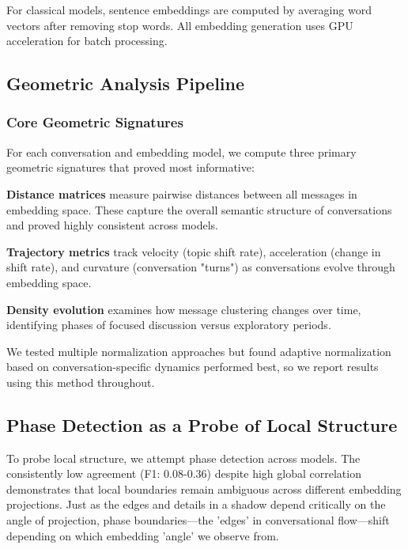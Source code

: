 \documentclass[11pt,letterpaper]{article}
\begin{document}
For classical models, sentence embeddings are computed by averaging word vectors after removing stop words. All embedding generation uses GPU acceleration for batch processing.

\subsection{Geometric Analysis Pipeline}

\subsubsection{Core Geometric Signatures}

For each conversation and embedding model, we compute three primary geometric signatures that proved most informative:

\textbf{Distance matrices} measure pairwise distances between all messages in embedding space. These capture the overall semantic structure of conversations and proved highly consistent across models.

\textbf{Trajectory metrics} track velocity (topic shift rate), acceleration (change in shift rate), and curvature (conversation "turns") as conversations evolve through embedding space.

\textbf{Density evolution} examines how message clustering changes over time, identifying phases of focused discussion versus exploratory periods.

We tested multiple normalization approaches but found adaptive normalization based on conversation-specific dynamics performed best, so we report results using this method throughout.

\subsection{Phase Detection as a Probe of Local Structure}

To probe local structure, we attempt phase detection across models. The consistently low agreement (F1: 0.08-0.36) despite high global correlation demonstrates that local boundaries remain ambiguous across different embedding projections. Just as the edges and details in a shadow depend critically on the angle of projection, phase boundaries—the 'edges' in conversational flow—shift depending on which embedding 'angle' we observe from.
\end{document}
